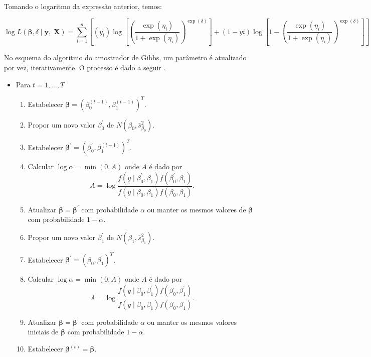 \noindent Tomando o logaritmo da expressão anterior, temos:

\[
\log L\left(\bm{\beta},\delta \mid\mathbf{y},\;\mathbf{X}\right)=\sum_{i=1}^{n} \left[(y_{i})\log \left[\left(\frac{\exp(\eta_{i})}{1+\exp(\eta_{i})}\right)^{\exp(\delta)}\right] + (1-y{i}) \log\left[1-\left(\frac{\exp(\eta_{i})}{1+\exp(\eta_{i})}\right)^{\exp(\delta)}\right]\right]
\]


No esquema do algoritmo do amostrador de Gibbs, um parâmetro é atualizado por vez, iterativamente. O processo é dado a seguir \cite{Ntzoufras2009}.

\begin{itemize}
	\item Para $t=1,\ldots,T$	
	\begin{enumerate}
		\item Estabelecer $\bm{\beta}=\left(\beta_{0}^{\left(t-1\right)},\beta_{1}^{\left(t-1\right)}\right)^{T}$.
		\item Propor um novo valor $\beta_{0}^{'}$ de $N\left(\beta_{0},\bar{s}_{\beta_{0}}^{2}\right)$.
		\item Estabelecer $\bm{\beta^{'}}=\left(\beta_{0}^{'},\beta_{1}^{\left(t-1\right)}\right)^{T}$.
		\item Calcular $\log\alpha=\min\left(0,A\right)$ onde $A$ é dado por
		$$A=\log\frac{f\left(y\mid\beta_{0}^{'},\beta_{1}\right)f\left(\beta_{0}^{'},\beta_{1}\right)}{f\left(y\mid\beta_{0},\beta_{1}\right)f\left(\beta_{0},\beta_{1}\right)}.$$
		\item Atualizar $\bm{\beta}=\bm{\beta^{'}}$ com probabilidade $\alpha$ ou manter os mesmos valores de $\bm{\beta}$ com probabilidade $1-\alpha$.
    	\item Propor um novo valor $\beta_{1}^{'}$ de $N\left(\beta_{1},\bar{s}_{\beta_{1}}^{2}\right)$.
		\item Estabelecer $\bm{\beta^{'}}=\left(\beta_{0},\beta_{1}^{'}\right)^{T}$.
		\item  Calcular $\log\alpha=\min\left(0,A\right)$ onde $A$ é dado por
		$$A=\log\frac{f\left(y\mid\beta_{0},\beta_{1}^{'}\right)f\left(\beta_{0},\beta_{1}^{'}\right)}{f\left(y\mid\beta_{0},\beta_{1}\right)f\left(\beta_{0},\beta_{1}\right)}.$$
		\item  Atualizar $\bm{\beta}=\bm{\beta^{'}}$ com probabilidade $\alpha$ ou manter os mesmos valores iniciais de $\bm{\beta}$ com probabilidade $1-\alpha$.
		\item Estabelecer $\bm{\beta}^{\left(t\right)}=\bm{\beta}$.
	\end{enumerate} 
\end{itemize}

